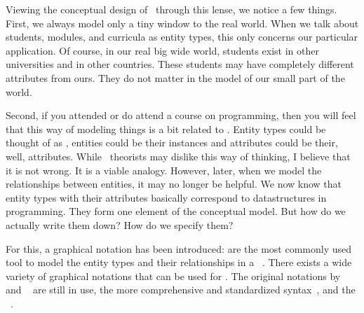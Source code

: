 Viewing the conceptual design of \dbs\ through this lense, we notice a few things.
First, we always model only a tiny window to the real world.
When we talk about students, modules, and curricula as entity types, this only concerns our particular application.
Of course, in our real big wide world, students exist in other universities and in other countries.
These students may have completely different attributes from ours.
They do not matter in the model of our small part of the world.

Second, if you attended or do attend a course on programming, then you will feel that this way of modeling things is a bit related to .
Entity types could be thought of as , entities could be their instances and attributes could be their, well, attributes.
While \db\ theorists may dislike this way of thinking, I believe that it is not wrong.
It is a viable analogy.
However, later, when we model the relationships between entities, it may no longer be helpful.%
\endhsection%
%
%
We now know that entity types with their attributes basically correspond to datastructures in programming.
They form one element of the conceptual model.
But how do we actually write them down?
How do we specify them?

For this, a graphical notation has been introduced:
 are the most commonly used tool to model the entity types and their relationships in a \db~\cite{C2002ERMHEFTALL,C1975TRMTAUVOD,C1976TERMTAUVOD,KW2012ASHOTEDAIM,WF1995DHQDM,B1990CMERMO}.
There exists a wide variety of graphical notations that can be used for .
The original notations by \citeauthor{B1969DSD}~\cite{B1969DSD} and \citeauthor{C1975TRMTAUVOD}~\cite{C1975TRMTAUVOD,C1976TERMTAUVOD} are still in use, the more comprehensive and standardized  syntax~\cite{FIPSPUB184,ISOIECIEEE2012ITMLP2SASFII}, and the ~\cite{OMG2017OUMLOU,RMHOSMUUIIIIOPPTRS1997UNG,BRJ1999TUMLRM}.%
%
\endhsection%
\endhsection%
%
%
\endhsection%
%
